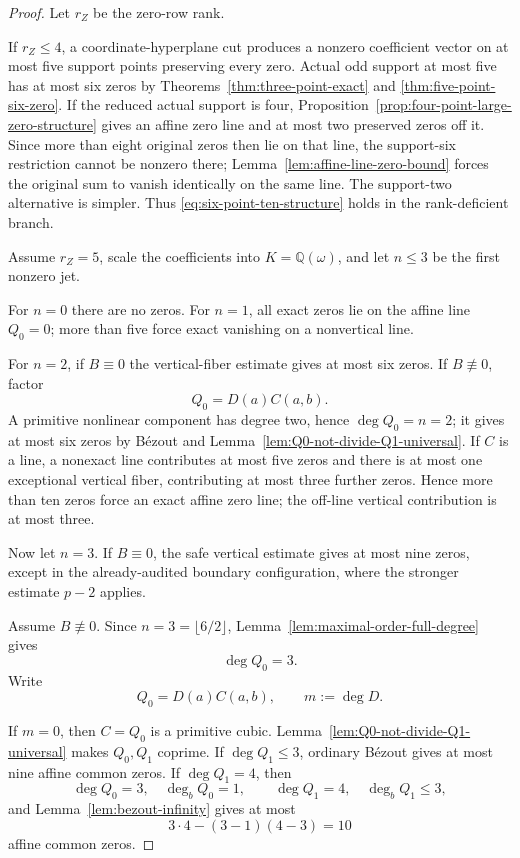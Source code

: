 \documentclass[11pt]{article}
\newcommand{\Q}{\mathbb Q}
\begin{document}
\begin{proof}
Let \(r_Z\) be the zero-row rank.

If \(r_Z\le4\), a coordinate-hyperplane cut produces a nonzero
coefficient vector on at most five support points preserving every
zero.  Actual odd support at most five has at most six zeros by
Theorems~\ref{thm:three-point-exact} and
\ref{thm:five-point-six-zero}.  If the reduced actual support is four,
Proposition~\ref{prop:four-point-large-zero-structure} gives an affine
zero line and at most two preserved zeros off it.  Since more than
eight original zeros then lie on that line, the support-six
restriction cannot be nonzero there; Lemma~\ref{lem:affine-line-zero-bound}
forces the original sum to vanish identically on the same line.  The
support-two alternative is simpler.  Thus
\eqref{eq:six-point-ten-structure} holds in the rank-deficient branch.

Assume \(r_Z=5\), scale the coefficients into \(K=\Q(\omega)\), and
let \(n\le3\) be the first nonzero jet.

For \(n=0\) there are no zeros.  For \(n=1\), all exact zeros lie on
the affine line \(Q_0=0\); more than five force exact vanishing on a
nonvertical line.

For \(n=2\), if \(B\equiv0\) the vertical-fiber estimate gives at most
six zeros.  If \(B\not\equiv0\), factor
\[
 Q_0=D(a)C(a,b).
\]
A primitive nonlinear component has degree two, hence
\(\deg Q_0=n=2\); it gives at most six zeros by B\'ezout and
Lemma~\ref{lem:Q0-not-divide-Q1-universal}.  If \(C\) is a line, a
nonexact line contributes at most five zeros and there is at most one
exceptional vertical fiber, contributing at most three further zeros.
Hence more than ten zeros force an exact affine zero line; the off-line
vertical contribution is at most three.

Now let \(n=3\).  If \(B\equiv0\), the safe vertical estimate gives at
most nine zeros, except in the already-audited boundary configuration,
where the stronger estimate \(p-2\) applies.

Assume \(B\not\equiv0\).
Since \(n=3=\lfloor6/2\rfloor\),
Lemma~\ref{lem:maximal-order-full-degree} gives
\[
 \deg Q_0=3.
\]
Write
\[
 Q_0=D(a)C(a,b),
 \qquad
 m:=\deg D.
\]

If \(m=0\), then \(C=Q_0\) is a primitive cubic.
Lemma~\ref{lem:Q0-not-divide-Q1-universal} makes \(Q_0,Q_1\)
coprime.  If \(\deg Q_1\le3\), ordinary B\'ezout gives at most nine
affine common zeros.  If \(\deg Q_1=4\), then
\[
 \deg Q_0=3,\quad\deg_bQ_0=1,
 \qquad
 \deg Q_1=4,\quad\deg_bQ_1\le3,
\]
and Lemma~\ref{lem:bezout-infinity} gives at most
\[
 3\cdot4-(3-1)(4-3)=10
\]
affine common zeros.


\end{proof}
\end{document}
